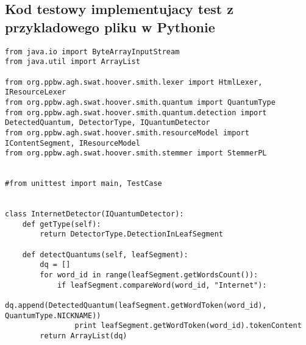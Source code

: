 \documentclass[12pt]{article}
\begin{document}
\subsection{Kod testowy implementujacy test z przykladowego pliku w Pythonie}
\begin{verbatim}
from java.io import ByteArrayInputStream
from java.util import ArrayList

from org.ppbw.agh.swat.hoover.smith.lexer import HtmlLexer, IResourceLexer
from org.ppbw.agh.swat.hoover.smith.quantum import QuantumType
from org.ppbw.agh.swat.hoover.smith.quantum.detection import DetectedQuantum, DetectorType, IQuantumDetector
from org.ppbw.agh.swat.hoover.smith.resourceModel import IContentSegment, IResourceModel
from org.ppbw.agh.swat.hoover.smith.stemmer import StemmerPL


#from unittest import main, TestCase


class InternetDetector(IQuantumDetector):
    def getType(self):
        return DetectorType.DetectionInLeafSegment

    def detectQuantums(self, leafSegment):
        dq = []
        for word_id in range(leafSegment.getWordsCount()):
            if leafSegment.compareWord(word_id, "Internet"):
                dq.append(DetectedQuantum(leafSegment.getWordToken(word_id), QuantumType.NICKNAME))
                print leafSegment.getWordToken(word_id).tokenContent
        return ArrayList(dq)


\end{verbatim}
\end{document}
